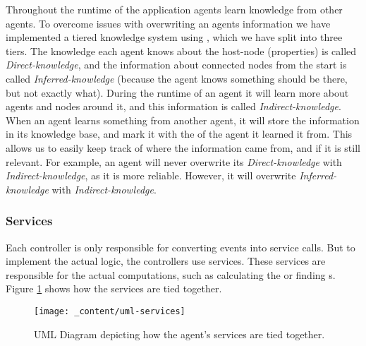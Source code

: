 Throughout the runtime of the application agents learn knowledge from other agents. To overcome issues with overwriting an agents information we have implemented a tiered knowledge system using , which we have split into three tiers. The knowledge each agent knows about the host-node (properties) is called \emph{Direct-knowledge}, and the information about connected nodes from the start is called \emph{Inferred-knowledge} (because the agent knows something should be there, but not exactly what). During the runtime of an agent it will learn more about agents and nodes around it, and this information is called \emph{Indirect-knowledge}. When an agent learns something from another agent, it will store the information in its knowledge base, and mark it with the  of the agent it learned it from. This allows us to easily keep track of where the information came from, and if it is still relevant. For example, an agent will never overwrite its \emph{Direct-knowledge} with \emph{Indirect-knowledge}, as it is more reliable. However, it will overwrite \emph{Inferred-knowledge} with \emph{Indirect-knowledge}.

\subsubsection{Services}
\label{sssec:services}
Each controller is only responsible for converting events into service calls. But to implement the actual logic, the controllers use services. These services are responsible for the actual computations, such as calculating the  or finding s. Figure \ref{fig:uml-services} shows how the services are tied together.

\begin{figure}[H]
    \centering
    \texttt{[image: \_content/uml-services]}
    \caption{UML Diagram depicting how the agent's services are tied together.}
    \label{fig:uml-services}
\end{figure}

